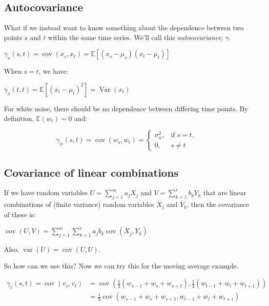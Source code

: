 \documentclass{article}
\begin{document}
\subsection{Autocovariance}

What if we instead want to know something about the dependence between two points $s$ and $t$ within the same time series. We'll call this \textit{autocovariance}, $\gamma$.

$\gamma_x(s,t) = \operatorname{cov}(x_s,x_t) = \mathbb{E}[(x_s -\mu_s)(x_t -\mu_t)]$

When $s=t$, we have:

$\gamma_x(t,t) = \mathbb{E}[(x_t -\mu_t)^2] = \operatorname{Var}(x_t)$

For white noise, there should be no dependence between differing time points. By definition, $\mathbb{E}(w_t)=0$ and:

\begin{equation}
\gamma_w(s,t) = \operatorname{cov}(w_s,w_t) = 
\begin{cases}
\sigma^2_w, & \text{if } s=t, \\
0, & s \neq t
\end{cases}
\end{equation}

\subsection{Covariance of linear combinations}

If we have random variables $U=\displaystyle\sum_{j=1}^m a_j X_j$ and $V=\displaystyle\sum_{k=1}^r b_k Y_k$ that are linear combinations of (finite variance) random variables ${X_j}$ and ${Y_k}$, then the covariance of these is:

$\operatorname{cov}(U,V) = \displaystyle\sum_{j=1}^m \displaystyle\sum_{k=1}^r a_j b_k \operatorname{cov}(X_j, Y_k)$

Also, $\operatorname{var}(U) = \operatorname{cov}(U,U)$.

So how can we use this? Now we can try this for the moving average example.

\begin{equation}
\begin{aligned}
\gamma_v(s,t) = \operatorname{cov}(v_s, v_t) &= \operatorname{cov}(\tfrac{1}{3}(w_{s-1}+w_s+w_{s+1}), \tfrac{1}{3}(w_{t-1}+w_t+w_{t+1})) \\
&= \tfrac{1}{9} \operatorname{cov}(w_{s-1}+w_s+w_{s+1}, w_{t-1}+w_t+w_{t+1})
\end{aligned}
\end{equation}
\end{document}
